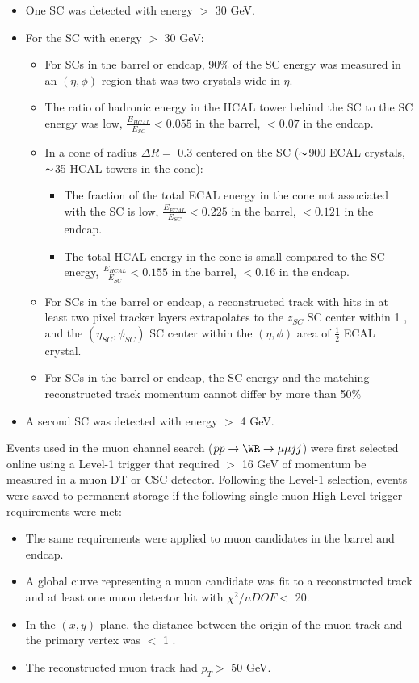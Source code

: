 \begin{itemize}
	\item One SC was detected with energy $>$ 30 GeV.
	\item For the SC with energy $>$ 30 GeV:
	\begin{itemize}
		\item For SCs in the barrel or endcap, 90\% of the SC energy was measured in an $(\eta, \phi)$ region that was two crystals wide in $\eta$.
		\item The ratio of hadronic energy in the HCAL tower behind the SC to the SC energy was low, $\frac{E_{HCAL}}{E_{SC}} < 0.055$ in the barrel, $< 0.07$ in the endcap.
		\item In a cone of radius $\Delta R =$ 0.3 centered on the SC ($\thicksim$900 ECAL crystals, $\thicksim$35 HCAL towers in the cone):
		\begin{itemize}
			\item The fraction of the total ECAL energy in the cone not associated with the SC is low, $\frac{E_{ECAL}}{E_{SC}} < 0.225$ in the barrel, $< 0.121$ in the endcap.
			\item The total HCAL energy in the cone is small compared to the SC energy, $\frac{E_{HCAL}}{E_{SC}} < 0.155$ in the barrel, $< 0.16$ in the endcap.
		\end{itemize}
		\item For SCs in the barrel or endcap, a reconstructed track with hits in at least two pixel tracker layers extrapolates to the 
			$z_{SC}$ SC center within 1 \cm, and the $(\eta_{SC}, \phi_{SC})$ SC center within the $(\eta, \phi)$ area of $\frac{1}{2}$ ECAL crystal.
		\item For SCs in the barrel or endcap, the SC energy and the matching reconstructed track momentum cannot differ by more than 50\%
	\end{itemize}
	\item A second SC was detected with energy $>$ 4 GeV.
\end{itemize}


Events used in the muon channel \WR search ($pp \rightarrow \WR \rightarrow \mu\mu jj$) were first selected online using 
a Level-1 trigger that required $>$ 16 GeV of momentum be measured in a muon DT or CSC detector.  Following 
the Level-1 selection, events were saved to permanent storage if the following single muon High Level trigger 
requirements were met: 

\begin{itemize}
	\item The same requirements were applied to muon candidates in the barrel and endcap.
	\item A global curve representing a muon candidate was fit to a reconstructed track and at least one muon detector hit with $\chi^{2}/nDOF <$ 20.
	\item In the $(x,y)$ plane, the distance between the origin of the muon track and the primary vertex was $<$ 1 \mm.
	\item The reconstructed muon track had $p_{T} >$ 50 GeV.
\end{itemize}

